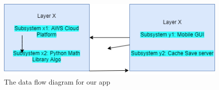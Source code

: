 \begin{figure}[h!]
	\centering
 	\includegraphics[width=\textwidth]{images/data_flow_syed}
 \caption{The data flow diagram for our app}
\end{figure}

